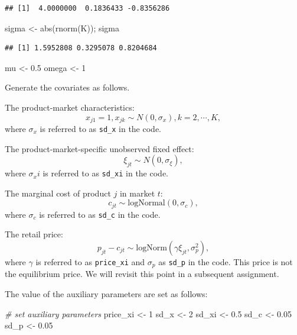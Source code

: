 \documentclass[
]{book}
\newenvironment{Shaded}{\begin{snugshade}}{\end{snugshade}}
\newcommand{\CommentTok}[1]{\textcolor[rgb]{0.56,0.35,0.01}{\textit{#1}}}
\newcommand{\DecValTok}[1]{\textcolor[rgb]{0.00,0.00,0.81}{#1}}
\newcommand{\FloatTok}[1]{\textcolor[rgb]{0.00,0.00,0.81}{#1}}
\newcommand{\FunctionTok}[1]{\textcolor[rgb]{0.00,0.00,0.00}{#1}}
\newcommand{\NormalTok}[1]{#1}
\newcommand{\OtherTok}[1]{\textcolor[rgb]{0.56,0.35,0.01}{#1}}
\begin{document}
\begin{verbatim}
## [1]  4.0000000  0.1836433 -0.8356286
\end{verbatim}

\begin{Shaded}
\begin{Highlighting}[]
\NormalTok{sigma }\OtherTok{\textless{}{-}} \FunctionTok{abs}\NormalTok{(}\FunctionTok{rnorm}\NormalTok{(K)); sigma}
\end{Highlighting}
\end{Shaded}

\begin{verbatim}
## [1] 1.5952808 0.3295078 0.8204684
\end{verbatim}

\begin{Shaded}
\begin{Highlighting}[]
\NormalTok{mu }\OtherTok{\textless{}{-}} \FloatTok{0.5}
\NormalTok{omega }\OtherTok{\textless{}{-}} \DecValTok{1}
\end{Highlighting}
\end{Shaded}

Generate the covariates as follows.

The product-market characteristics:
\[
x_{j1} = 1, x_{jk} \sim N(0, \sigma_x), k = 2, \cdots, K,
\]
where \(\sigma_x\) is referred to as \texttt{sd\_x} in the code.

The product-market-specific unobserved fixed effect:
\[
\xi_{jt} \sim N(0, \sigma_\xi),
\]
where \(\sigma_xi\) is referred to as \texttt{sd\_xi} in the code.

The marginal cost of product \(j\) in market \(t\):
\[
c_{jt} \sim \text{logNormal}(0, \sigma_c),
\]
where \(\sigma_c\) is referred to as \texttt{sd\_c} in the code.

The retail price:
\[
p_{jt} - c_{jt} \sim \text{logNorm}(\gamma \xi_{jt}, \sigma_p^2),
\]
where \(\gamma\) is referred to as \texttt{price\_xi} and \(\sigma_p\) as \texttt{sd\_p} in the code. This price is not the equilibrium price. We will revisit this point in a subsequent assignment.

The value of the auxiliary parameters are set as follows:

\begin{Shaded}
\begin{Highlighting}[]
\CommentTok{\# set auxiliary parameters}
\NormalTok{price\_xi }\OtherTok{\textless{}{-}} \DecValTok{1}
\NormalTok{sd\_x }\OtherTok{\textless{}{-}} \DecValTok{2}
\NormalTok{sd\_xi }\OtherTok{\textless{}{-}} \FloatTok{0.5}
\NormalTok{sd\_c }\OtherTok{\textless{}{-}} \FloatTok{0.05}
\NormalTok{sd\_p }\OtherTok{\textless{}{-}} \FloatTok{0.05}
\end{Highlighting}
\end{Shaded}
\end{document}
